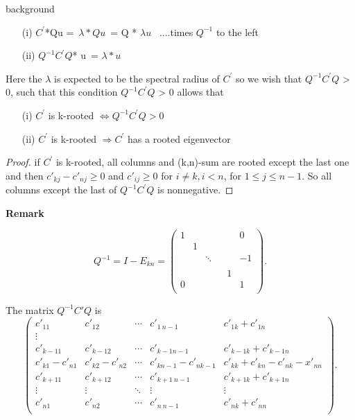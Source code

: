 \documentclass{beamer}
\theoremstyle{plain}
\theoremstyle{definition}
\begin{document}
\begin{frame}{background}

    \begin{enumerate}
        \item[(i)] $C^{ '}$*Qu = $\lambda * Qu $ = Q * $\lambda u$  ....times $Q^{-1}$ to the left
        \item[(ii)] $Q^{-1} C^{ '}Q$* u = $\lambda * u$
    \end{enumerate}

    Here the $\lambda$ is expected to be the spectral radius of $C^{ '}$ so we wish that $Q^{-1}C^{ '}Q$ > 0, such that this condition $Q^{-1}C^{ '}Q$ > 0 allows that \\
    \begin{enumerate}
        \item[(i)] $ C^{ '}$ is k-rooted $\Leftrightarrow Q^{-1}C^{ '}Q > 0$
        \item[(ii)] $ C^{ '}$ is k-rooted $\Rightarrow C^{ '}$ has a rooted eigenvector
    \end{enumerate}
	\begin{proof}
        if $C^{ '}$ is k-rooted, all columns and (k,n)-sum are rooted except the last one and then $c'_{kj}-c'_{nj} \geq 0$ and $c'_{ij} \geq 0$ for $i \neq k, i < n$, for $1 \leq j \leq n-1$. So all columns except the last of $Q^{-1}C^{ '}Q$ is nonnegative.
    \end{proof}


\end{frame}

\begin{frame}{\bf Remark}

$$Q^{-1}=I-E_{kn}=\begin{pmatrix}
1 &  & & &  & 0 \\
 & 1 &  &      &  &  \\
 &  & \ddots & &  & -1 \\
 &  &        & &  &  \\
  &  & & & 1 &  \\
0 &  & & &  & 1 \\
\end{pmatrix}.$$

The matrix $Q^{-1}C'Q$ is
$$\begin{pmatrix}
c'_{11}     & c'_{12} & \cdots     & c'_{1\ n-1} & c'_{1k}+c'_{1n} \\
\vdots \\
c'_{k-11}     & c'_{k-1 2}           & \cdots     & c'_{k-1 n-1} & c'_{k-1k}+c'_{k-1n} \\
c'_{k1}-c'_{n1} & c'_{k2}-c'_{n2} &\cdots      &c'_{kn-1}-c'_{nk-1}& c'_{kk}+c'_{kn}-c'_{nk}-x'_{nn}\\
c'_{k+11}     & c'_{k+12}           & \cdots     & c'_{k+1\ n-1} & c'_{k+1k}+c'_{k+1n} \\
\vdots              & \vdots & \ddots              & \vdots & \vdots \\
c'_{n1}             & c'_{n2} & \cdots             & c'_{n\ n-1} & c'_{nk}+c'_{nn} \\
\end{pmatrix}.
$$
\end{frame}
\end{document}
